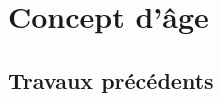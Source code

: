 \documentclass[../main/main.tex]{subfiles}
\begin{document}

\vfill

\minitoc

\vfill

\newpage

\section{Concept d'\^age}\label{sec:age}

\subsection{Travaux précédents}\label{ssec:rates}
\end{document}
